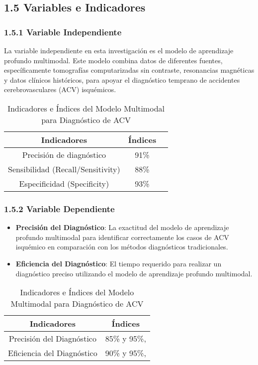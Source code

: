 \subsection{1.5 Variables e Indicadores}
\subsubsection{1.5.1 Variable Independiente}
La variable independiente en esta investigación es el modelo de aprendizaje profundo multimodal. Este modelo combina datos de diferentes fuentes, específicamente tomografías computarizadas sin contraste, resonancias magnéticas y datos clínicos históricos, para apoyar el diagnóstico temprano de accidentes cerebrovasculares (ACV) isquémicos.
\begin{table}[h!]
    \centering
    \begin{tabular}{|c|c|c|}
        \hline
        \rowcolor[HTML]{C0C0C0}
        \textbf{Indicadores} & \textbf{Índices}  \\
        \hline
        Precisión de diagnóstico & 91\%\\
        \hline
        Sensibilidad (Recall/Sensitivity)&  88\%\\
        \hline
        Especificidad (Specificity)&  93\%\\
        \hline
    \end{tabular}
    \caption{Indicadores e Índices del Modelo Multimodal para Diagnóstico de ACV}
    \label{tab:preciseg}
\end{table}
\subsubsection{1.5.2 Variable Dependiente}
\begin{itemize}
    \item \textbf{Precisión del Diagnóstico}: La exactitud del modelo de aprendizaje profundo multimodal para identificar correctamente los casos de ACV isquémico en comparación con los métodos diagnósticos tradicionales.
    \item \textbf{Eficiencia del Diagnóstico}: El tiempo requerido para realizar un diagnóstico preciso utilizando el modelo de aprendizaje profundo multimodal.
\end{itemize}
\begin{table}[h!]
    \centering
    \begin{tabular}{|c|c|}
        \hline
         \rowcolor[HTML]{C0C0C0}
        \textbf{Indicadores} & \textbf{Índices} \\ \hline
        Precisión del Diagnóstico &  85\% y 95\%,  \\ \hline
        Eficiencia del Diagnóstico & 90\% y 95\%,  \\ \hline
    \end{tabular}
    \caption{Indicadores e Índices del Modelo Multimodal para Diagnóstico de ACV}
    \label{table:indicadores_indices}
\end{table}

